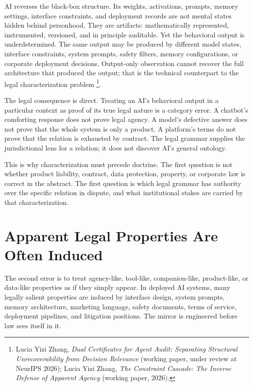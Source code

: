 \documentclass{lawreview}
\begin{document}
    AI reverses the black-box structure. Its weights, activations, prompts, memory settings, interface constraints, and deployment records are not mental states hidden behind personhood. They are artifacts: mathematically represented, instrumented, versioned, and in principle auditable. Yet the behavioral output is underdetermined. The same output may be produced by different model states, interface constraints, system prompts, safety filters, memory configurations, or corporate deployment decisions. Output-only observation cannot recover the full architecture that produced the output; that is the technical counterpart to the legal characterization problem \footnote{Lucia Yizi Zhang, \emph{Dual Certificates for Agent Audit: Separating Structural Unrecoverability from Decision Relevance} (working paper, under review at NeurIPS 2026); Lucia Yizi Zhang, \emph{The Constraint Cascade: The Inverse Defense of Apparent Agency} (working paper, 2026).}.

    The legal consequence is direct. Treating an AI's behavioral output in a particular context as proof of its true legal nature is a category error. A chatbot's comforting response does not prove legal agency. A model's defective answer does not prove that the whole system is only a product. A platform's terms do not prove that the relation is exhausted by contract. The legal grammar supplies the jurisdictional lens for a relation; it does not discover AI's general ontology.

    This is why characterization must precede doctrine. The first question is not whether product liability, contract, data protection, property, or corporate law is correct in the abstract. The first question is which legal grammar has authority over the specific relation in dispute, and what institutional stakes are carried by that characterization.

    \section{Apparent Legal Properties Are Often Induced}

    The second error is to treat agency-like, tool-like, companion-like, product-like, or data-like properties as if they simply appear. In deployed AI systems, many legally salient properties are induced by interface design, system prompts, memory architecture, marketing language, safety documents, terms of service, deployment pipelines, and litigation positions. The mirror is engineered before law sees itself in it.
\end{document}
